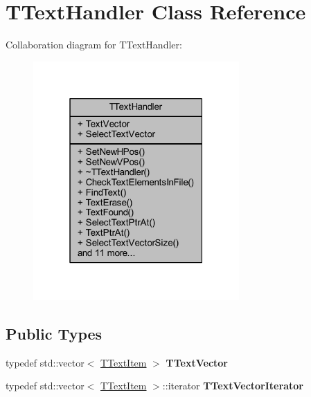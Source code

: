 \hypertarget{class_t_text_handler}{}\section{T\+Text\+Handler Class Reference}
\label{class_t_text_handler}


Collaboration diagram for T\+Text\+Handler\+:\nopagebreak
\begin{figure}[H]
\begin{center}
\leavevmode
\includegraphics[width=223pt]{class_t_text_handler__coll__graph}
\end{center}
\end{figure}
\subsection*{Public Types}
\begin{DoxyCompactItemize}
\item 
\mbox{\label{class_t_text_handler_a2538805e05af3522211884f3c2426e84}} 
typedef std\+::vector$<$ \mbox{\hyperlink{class_t_text_item}{T\+Text\+Item}} $>$ {\bfseries T\+Text\+Vector}
\item 
\mbox{\label{class_t_text_handler_a691b60d7ecb9bd6f8d8355467f3136e2}} 
typedef std\+::vector$<$ \mbox{\hyperlink{class_t_text_item}{T\+Text\+Item}} $>$\+::iterator {\bfseries T\+Text\+Vector\+Iterator}
\end{DoxyCompactItemize}
